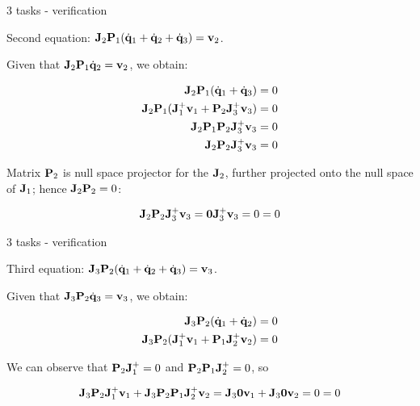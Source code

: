\documentclass{beamer}
\newcommand{\dq} {\dot{\mathbf{q}}}
\begin{document}
\begin{frame}{3 tasks - verification}
	\begin{flushleft}
		
		Second equation: $\bo{J}_2 \bo{P}_1 (\dq_1 + \dq_2 + \dq_3) = \bo{v}_2$.
		
		\bigskip
		
		Given that $\bo{J}_2 \bo{P}_1 \dq_2 = \bo{v}_2$, we obtain:
		
		\begin{align}
			\bo{J}_2 \bo{P}_1 (\dq_1 + \dq_3) = 0 
			\\
			\bo{J}_2 \bo{P}_1 (\bo{J}_1^+ \bo{v}_1 
			+ 
			\bo{P}_2 \bo{J}_3^+ \bo{v}_3) = 0 
			\\
			 \bo{J}_2 \bo{P}_1 \bo{P}_2 \bo{J}_3^+ \bo{v}_3 = 0  \\
			 \bo{J}_2 \bo{P}_2 \bo{J}_3^+ \bo{v}_3 = 0
		\end{align}
		
		Matrix $\mathbf{P}_2$ is null space projector for the $\mathbf{J}_2$, further projected onto the null space of $\mathbf{J}_1$; hence $\mathbf{J}_2 \mathbf{P}_2 = 0$: 
		
		\begin{align}
			\mathbf{J}_2 \mathbf{P}_2 \mathbf{J}_3^+ \mathbf{v}_3 = 
			\mathbf{0} \mathbf{J}_3^+ \mathbf{v}_3 = 0 = 0
		\end{align}
	
	\end{flushleft}
\end{frame}




\begin{frame}{3 tasks - verification}
	\begin{flushleft}
		
		Third equation: $\bo{J}_3 \bo{P}_2 (\dq_1 + \dq_2 + \dq_3) = \bo{v}_3$.
		
		\bigskip
		
		Given that $\bo{J}_3 \bo{P}_2 \dq_3 = \bo{v}_3$, we obtain:
		
		\begin{align}
			\bo{J}_3 \bo{P}_2 (\dq_1 + \dq_2) = 0 
			\\
			\bo{J}_3 \bo{P}_2 (
			\bo{J}_1^+ \bo{v}_1
			 + 
			 \bo{P}_1 \bo{J}_2^+ \bo{v}_2) = 0 
		\end{align}
		
		We can observe that $\mathbf{P}_2  \mathbf{J}_1^+ = 0$ and $\mathbf{P}_2 \mathbf{P}_1 \mathbf{J}_2^+ = 0$, so
		
		\begin{align}
	\mathbf{J}_3 \mathbf{P}_2\mathbf{J}_1^+ \mathbf{v}_1
	+ 
	\mathbf{J}_3 \mathbf{P}_2 \mathbf{P}_1 \mathbf{J}_2^+ \mathbf{v}_2
	= 
	\mathbf{J}_3 \mathbf{0} \mathbf{v}_1
	+ 
	\mathbf{J}_3 \mathbf{0} \mathbf{v}_2  = 0 = 0
		\end{align}		
		
	\end{flushleft}
\end{frame}
\end{document}
